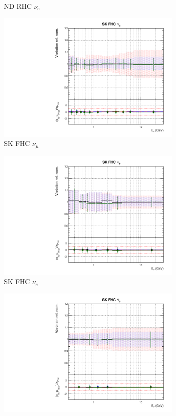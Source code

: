 \begin{figure}
\begin{subfigure}{0.24\textwidth}
  \caption{ND RHC $\nu_e$}
\end{subfigure}
\begin{subfigure}{0.24\textwidth}
  \centering
  \includegraphics[width=0.95\linewidth]{figs/polyasmvsflux_8}
  \caption{SK FHC $\nu_{\mu}$}
\end{subfigure}
\begin{subfigure}{0.24\textwidth}
  \centering
  \includegraphics[width=0.95\linewidth]{figs/polyasmvsflux_9}
  \caption{SK FHC $\nu_e$}
\end{subfigure}
\begin{subfigure}{0.24\textwidth}
  \centering
  \includegraphics[width=0.95\linewidth]{figs/polyasmvsflux_10}

\end{subfigure}
\end{figure}
